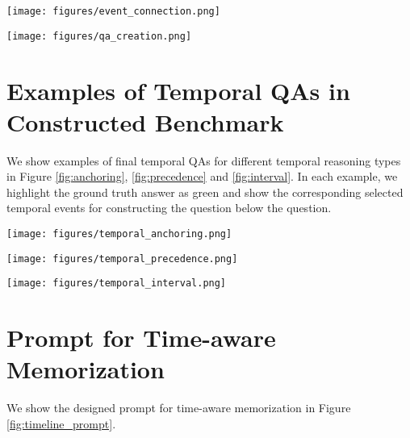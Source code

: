 \begin{figure*}
    \centering
    \texttt{[image: figures/event\_connection.png]}
    \caption{Prompt for Temporal Event Linking.}
    \label{fig:event_connection}
\vspace{-5mm}
\end{figure*}

\begin{figure*}
    \centering
    \texttt{[image: figures/qa\_creation.png]}
    \caption{Prompt for Temporal QA Creation.}
    \label{fig:qa_creation}
\vspace{-5mm}
\end{figure*}

\section{Examples of Temporal QAs in Constructed Benchmark}
\label{sec:QAs}

We show examples of final temporal QAs for different temporal reasoning types in Figure \ref{fig:anchoring}, \ref{fig:precedence} and \ref{fig:interval}. In each example, we highlight the ground truth answer as green and show the corresponding selected temporal events for constructing the question below the question.

\begin{figure*}
    \centering
    \texttt{[image: figures/temporal\_anchoring.png]}
    \caption{An example temporal QA for Temporal Anchoring}
    \label{fig:anchoring}
\end{figure*}

\begin{figure*}
    \centering
    \texttt{[image: figures/temporal\_precedence.png]}
    \caption{An example temporal QA for Temporal Precedence}
    \label{fig:precedence}
\end{figure*}

\begin{figure*}
    \centering
    \texttt{[image: figures/temporal\_interval.png]}
    \caption{An example temporal QA for Temporal Interval}
    \label{fig:interval}
\end{figure*}

\section{Prompt for Time-aware Memorization}
\label{sec:timeline_prompt}
We show the designed prompt for time-aware memorization in Figure \ref{fig:timeline_prompt}.

